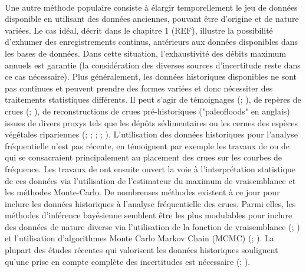 \documentclass[11pt]{article}
\begin{document}
	\paragraph{} Une autre méthode populaire consiste à élargir temporellement le jeu de données disponible en utilisant des données anciennes, pouvant être d'origine et de nature variées. Le cas idéal, décrit dans le chapitre 1 (REF), illustre la possibilité d'exhumer des enregistrements continus, antérieurs aux données disponibles dans les bases de données. Dans cette situation, l'exhaustivité des débits maximum annuels est garantie (la considération des diverses sources d'incertitude reste dans ce cas nécessaire). Plus généralement, les données historiques disponibles ne sont pas continues et peuvent prendre des formes variées et donc nécessiter des traitements statistiques différents. Il peut s'agir de témoignages (\cite{pichard_les_1995}; \cite{kjeldsen_documentary_2014}), de repères de crues (\cite{parkes_defining_2016}; \cite{engeland_new_2020}), de reconstructions de crues pré-historiques ("paleofloods" en anglais) issues de divers proxys tels que les dépôts sédimentaires ou les cernes des espèces végétales ripariennes (\cite{stedinger_flood_1986}; \cite{benito_use_2004}; \cite{dezileau_multidating_2014}; \cite{st_george_paleofloods_2020}; \cite{engeland_new_2020}). L'utilisation des données historiques pour l'analyse fréquentielle n'est pas récente, en témoignent par exemple les travaux de \cite{benson_use_1950} ou de \cite{hirsch_plotting_1987} qui se consacraient principalement au placement des crues sur les courbes de fréquence. Les travaux de \cite{stedinger_flood_1986} ont ensuite ouvert la voie à l'interprétation statistique de ces données via l'utilisation de l'estimateur du maximum de vraisemblance et les méthodes Monte-Carlo. De nombreuses méthodes existent à ce jour pour inclure les données historiques à l'analyse fréquentielle des crues. Parmi elles, les méthodes d'inférence bayésienne semblent être les plus modulables pour inclure des données de nature diverse via l'utilisation de la fonction de vraisemblance (\cite{stedinger_flood_1986}; \cite{kuczera_comprehensive_1999}) et l'utilisation d'algorithmes Monte Carlo Markov Chain (MCMC) (\cite{reis_bayesian_2005}; \cite{renard_application_2006}). La plupart des études récentes qui valorisent les données historiques soulignent qu'une prise en compte complète des incertitudes est nécessaire (\cite{neppel_flood_2010}; \cite{parkes_defining_2016}).
	
\end{document}
